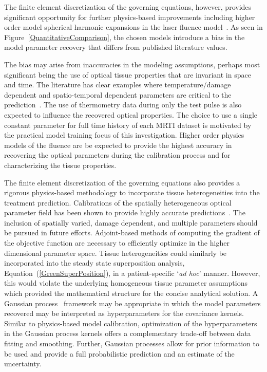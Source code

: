 \documentclass[12pt]{article}
\newcommand{\eqn}[1]{(\ref{#1})}
\begin{document}
The finite element discretization of the governing equations, however, 
provides significant opportunity for further
physics-based improvements including 
higher order model spherical harmonic expansions in the laser fluence 
model~\cite{carp2004radiative}. 
As seen in Figure~\ref{QuantitativeComparison}, the {\color{red}chosen} models
introduce a bias in the model parameter
recovery that differs from published literature values.
{\color{red}The bias may arise from inaccuracies in the modeling assumptions, perhaps
most significant being the use of optical tissue properties that are
invariant in space and time. The literature has clear examples
where temperature/damage dependent and spatio-temporal dependent
parameters are critical to the
prediction~\cite{Mohammed05,Schutt2008}. The use of thermometry data during
only the test pulse is also expected to influence the recovered optical
properties.
The choice to use a single constant parameter for full time history of each
MRTI dataset is motivated by
the practical model training focus of this investigation.
Higher order physics
models of the fluence are be expected to provide the highest accuracy in
recovering the optical parameters during the calibration process and for
characterizing the tissue properties.


 }

The finite element discretization of the governing equations
also provides a rigorous physics-based methodology to 
incorporate tissue heterogeneities into the treatment prediction.
Calibrations of the spatially heterogeneous 
optical parameter field has been shown to provide highly accurate 
predictions~\cite{fuentes2013inverse}.
{\color{red} The inclusion of spatially varied, damage dependent, and
multiple parameters should be pursued in future efforts.}
Adjoint-based methods of computing the gradient of the objective 
function are necessary to efficiently optimize in the higher dimensional parameter space.
Tissue heterogeneities could similarly be incorporated
into the steady state superposition analysis, Equation~\eqn{GreenSuperPosition}, in a patient-specific
`\textit{ad hoc}' manner. However, this would violate the underlying homogeneous
tissue parameter assumptions which provided the mathematical
structure for the concise analytical solution.
A Gaussian process~\cite{rasmussen2006gaussian,Constantinescu2013} 
framework may be appropriate
in which the model parameters recovered may be interpreted as hyperparameters
for the covariance kernels.
Similar to physics-based model calibration, optimization of the
hyperparameters in the Gaussian process kernels offers a complementary
trade-off between data fitting and smoothing. Further, Gaussian processes allow
for prior information to be used and provide a full probabilistic prediction
and an estimate of the uncertainty. 
\end{document}
